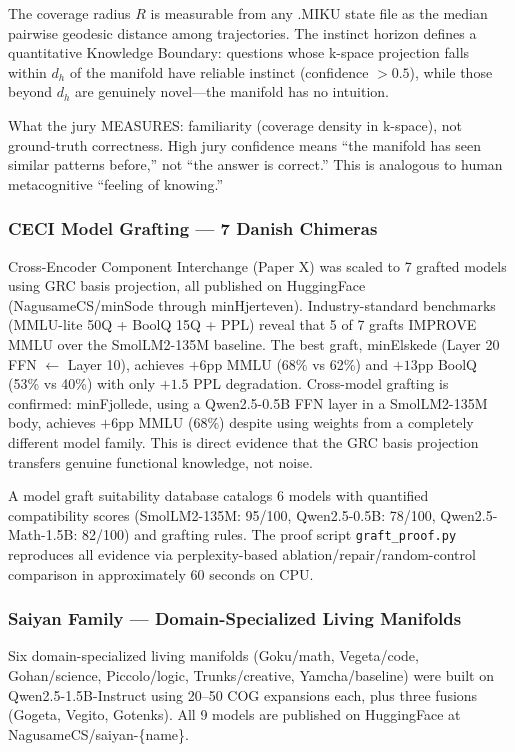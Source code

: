 \documentclass[11pt]{article}
\begin{document}
The coverage radius $R$ is measurable from any .MIKU state file as the median pairwise geodesic distance among trajectories. The instinct horizon defines a quantitative Knowledge Boundary: questions whose k-space projection falls within $d_h$ of the manifold have reliable instinct (confidence $> 0.5$), while those beyond $d_h$ are genuinely novel---the manifold has no intuition.

What the jury MEASURES: familiarity (coverage density in k-space), not ground-truth correctness. High jury confidence means ``the manifold has seen similar patterns before,'' not ``the answer is correct.'' This is analogous to human metacognitive ``feeling of knowing.''

\subsubsection*{CECI Model Grafting --- 7 Danish Chimeras}

Cross-Encoder Component Interchange (Paper X) was scaled to 7 grafted models using GRC basis projection, all published on HuggingFace (NagusameCS/minSode through minHjerteven). Industry-standard benchmarks (MMLU-lite 50Q + BoolQ 15Q + PPL) reveal that 5 of 7 grafts IMPROVE MMLU over the SmolLM2-135M baseline. The best graft, minElskede (Layer 20 FFN $\leftarrow$ Layer 10), achieves $+6$pp MMLU (68\% vs 62\%) and $+13$pp BoolQ (53\% vs 40\%) with only $+1.5$ PPL degradation. Cross-model grafting is confirmed: minFjollede, using a Qwen2.5-0.5B FFN layer in a SmolLM2-135M body, achieves $+6$pp MMLU ($68\%$) despite using weights from a completely different model family. This is direct evidence that the GRC basis projection transfers genuine functional knowledge, not noise.

A model graft suitability database catalogs 6 models with quantified compatibility scores (SmolLM2-135M: 95/100, Qwen2.5-0.5B: 78/100, Qwen2.5-Math-1.5B: 82/100) and grafting rules. The proof script \texttt{graft\_proof.py} reproduces all evidence via perplexity-based ablation/repair/random-control comparison in approximately 60 seconds on CPU.

\subsubsection*{Saiyan Family --- Domain-Specialized Living Manifolds}

Six domain-specialized living manifolds (Goku/math, Vegeta/code, Gohan/science, Piccolo/logic, Trunks/creative, Yamcha/baseline) were built on Qwen2.5-1.5B-Instruct using 20--50 COG expansions each, plus three fusions (Gogeta, Vegito, Gotenks). All 9 models are published on HuggingFace at NagusameCS/saiyan-\{name\}.
\end{document}
